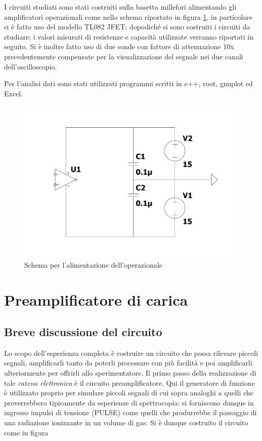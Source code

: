 \documentclass{article}
\begin{document}
I circuiti studiati sono stati costruiti sulla basetta millefori alimentando gli amplificatori operazionali come nello schema riportato 
in figura \ref{fig:alimentazione}, in particolare si è fatto uso del modello TL082 JFET; dopodiché si sono 
costruiti i circuiti da studiare;  i valori misurati di resistenze e capacità utilizzate verranno riportati in seguito.
Si è inoltre fatto uso di due sonde con fattore di attenuazione 10x precedentemente compensate per la visualizzazione del 
segnale nei due canali dell'oscilloscopio.

Per l'analisi dati sono stati utilizzati programmi scritti in c++, root, gnuplot ed Excel.

\begin{center}
\begin{figure}[H]
\centering
\includegraphics[scale=0.28, angle=0]{alimentazione.pdf}
\caption{ Schema per l'alimentazione dell'operazionale }
\label{fig:alimentazione}
\end{figure}
\end{center} 

\section{Preamplificatore di carica}

\subsection{Breve discussione del circuito}

Lo scopo dell'esperienza completa è costruire un circuito che possa rilevare piccoli segnali, amplificarli tanto da poterli processare con più facilità
e poi amplificarli ulteriormente per offrirli allo sperimentatore. Il primo passo della realizzazione di tale \textit{catena elettronica} è il circuito
preamplificatore. Qui il generatore di funzione è utilizzato proprio per simulare piccoli segnali di cui sopra analoghi a quelli che proverrebbero tipicamente 
da esperienze di spettrocopia: si forniscono dunque in ingresso impulsi di tensione (PULSE) come quelli che produrrebbe il passaggio di una radiazione ionizzante in 
un volume di gas. 
Si è dunque costruito il circuito come in figura
\end{document}
